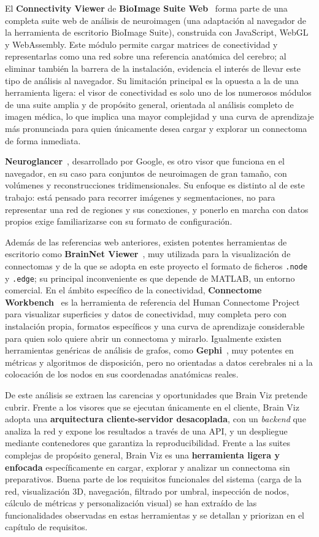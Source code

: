 El \textbf{Connectivity Viewer} de \textbf{BioImage Suite Web}~\cite{bisweb} forma parte de una
completa suite web de análisis de neuroimagen (una adaptación al navegador de la herramienta de
escritorio BioImage Suite), construida con JavaScript, WebGL y WebAssembly. Este módulo permite
cargar matrices de conectividad y representarlas como una red sobre una referencia anatómica del
cerebro; al eliminar también la barrera de la instalación, evidencia el interés de llevar este tipo
de análisis al navegador. Su limitación principal es la opuesta a la de una herramienta ligera: el
visor de conectividad es solo uno de los numerosos módulos de una suite amplia y de propósito
general, orientada al análisis completo de imagen médica, lo que implica una mayor complejidad y una
curva de aprendizaje más pronunciada para quien únicamente desea cargar y explorar un connectoma de
forma inmediata.

\textbf{Neuroglancer}~\cite{neuroglancer}, desarrollado por Google, es otro visor que funciona en el
navegador, en su caso para conjuntos de neuroimagen de gran tamaño, con volúmenes y reconstrucciones
tridimensionales. Su enfoque es distinto al de este trabajo: está pensado para recorrer imágenes y
segmentaciones, no para representar una red de regiones y sus conexiones, y ponerlo en marcha con
datos propios exige familiarizarse con su formato de configuración.

Además de las referencias web anteriores, existen potentes herramientas de escritorio como
\textbf{BrainNet Viewer}~\cite{brainnet}, muy utilizada para la visualización de connectomas y de la
que se adopta en este proyecto el formato de ficheros \texttt{.node} y \texttt{.edge}; su principal
inconveniente es que depende de MATLAB, un entorno comercial. En el ámbito específico de la conectividad,
\textbf{Connectome Workbench}~\cite{workbench} es la herramienta de referencia del Human Connectome
Project para visualizar superficies y datos de conectividad, muy completa pero con instalación
propia, formatos específicos y una curva de aprendizaje considerable para quien solo quiere abrir un
connectoma y mirarlo. Igualmente existen herramientas genéricas de análisis de grafos, como
\textbf{Gephi}~\cite{gephi}, muy potentes en métricas y
algoritmos de disposición, pero no orientadas a datos cerebrales ni a la colocación de los nodos en
sus coordenadas anatómicas reales.

De este análisis se extraen las carencias y oportunidades que Brain Viz pretende cubrir. Frente a
los visores que se ejecutan únicamente en el cliente, Brain Viz adopta una \textbf{arquitectura
cliente-servidor desacoplada}, con un \textit{backend} que analiza la red y expone los resultados a
través de una API, y un despliegue mediante contenedores que garantiza la reproducibilidad. Frente a
las suites complejas de propósito general, Brain Viz es una \textbf{herramienta ligera y enfocada}
específicamente en cargar, explorar y analizar un connectoma sin preparativos. Buena parte de los
requisitos funcionales del sistema (carga de la red, visualización 3D, navegación, filtrado por
umbral, inspección de nodos, cálculo de métricas y personalización visual) se han extraído de las
funcionalidades observadas en estas herramientas y se detallan y priorizan en el capítulo de
requisitos.

